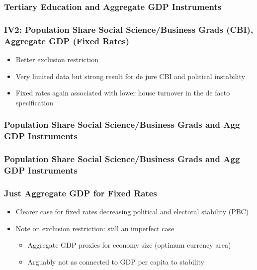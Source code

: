 \documentclass{beamer}
\begin{document}
    \begin{frame}
        \frametitle{Tertiary Education and Aggregate GDP Instruments}
        {
            \let\oldcentering\centering
            \renewcommand\centering{\tiny\oldcentering}
            
        }
    \end{frame}

    \begin{frame}
        \frametitle{IV2: Population Share Social Science/Business Grads (CBI), Aggregate GDP (Fixed Rates)}
        \begin{itemize}
            \item Better exclusion restriction
            \item Very limited data but strong result for de jure CBI and political instability
            \item Fixed rates again associated with lower house turnover in the de facto specification
        \end{itemize}
    \end{frame}

    \begin{frame}
        \frametitle{Population Share Social Science/Business Grads and Agg GDP Instruments}
        {
            \let\oldcentering\centering
            \renewcommand\centering{\tiny\oldcentering}
            
        }
    \end{frame}

    \begin{frame}
        \frametitle{Population Share Social Science/Business Grads and Agg GDP Instruments}
        {
            \let\oldcentering\centering
            \renewcommand\centering{\tiny\oldcentering}
            
        }
    \end{frame}

    \begin{frame}
        \frametitle{Just Aggregate GDP for Fixed Rates}
        \begin{itemize}
            \item Clearer case for fixed rates decreasing political and electoral stability (PBC)
            \item Note on exclusion restriction: still an imperfect case
            \begin{itemize}
                \item Aggregate GDP proxies for economy size (optimum currency area)
                \item Arguably not as connected to GDP per capita to stability
            \end{itemize}
        \end{itemize}
    \end{frame}
\end{document}
